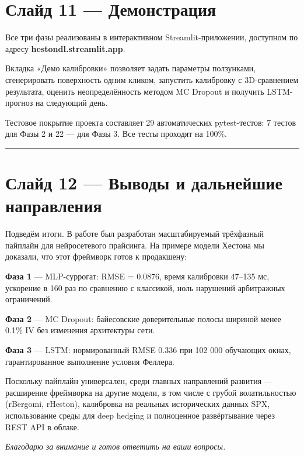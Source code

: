 \documentclass[12pt,a4paper]{article}
\begin{document}
\section*{Слайд 11 — Демонстрация}

Все три фазы реализованы в интерактивном Streamlit-приложении, доступном по адресу \textbf{hestondl.streamlit.app}.

Вкладка «Демо калибровки» позволяет задать параметры ползунками, сгенерировать поверхность одним кликом, запустить калибровку с 3D-сравнением результата, оценить неопределённость методом MC Dropout и получить LSTM-прогноз на следующий день.

Тестовое покрытие проекта составляет 29 автоматических pytest-тестов: 7 тестов для Фазы 2 и 22 — для Фазы 3. Все тесты проходят на 100\%.

\vspace{1em}\hrule\vspace{1em}

\section*{Слайд 12 — Выводы и дальнейшие направления}

Подведём итоги. В работе был разработан масштабируемый трёхфазный пайплайн для нейросетевого прайсинга. На примере модели Хестона мы доказали, что этот фреймворк готов к продакшену:

\textbf{Фаза 1} — MLP-суррогат: RMSE = 0.0876, время калибровки 47–135 мс, ускорение в 160 раз по сравнению с классикой, ноль нарушений арбитражных ограничений.

\textbf{Фаза 2} — MC Dropout: байесовские доверительные полосы шириной менее 0.1\% IV без изменения архитектуры сети.

\textbf{Фаза 3} — LSTM: нормированный RMSE 0.336 при 102 000 обучающих окнах, гарантированное выполнение условия Феллера.

Поскольку пайплайн универсален, среди главных направлений развития — расширение фреймворка на другие модели, в том числе с грубой волатильностью (rBergomi, rHeston), калибровка на реальных исторических данных SPX, использование среды для deep hedging и полноценное развёртывание через REST API в облаке.

\vspace{1.5em}
\begin{center}
    \textit{Благодарю за внимание и готов ответить на ваши вопросы.}
\end{center}
\end{document}

